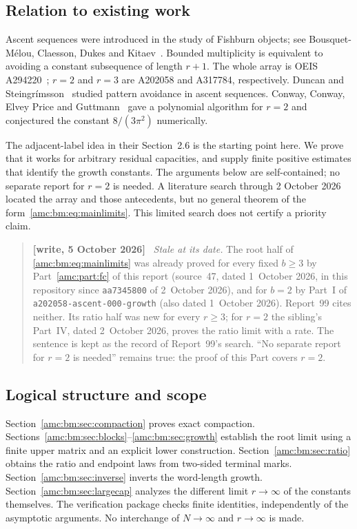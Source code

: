\documentclass[11pt,letterpaper]{article}
\theoremstyle{remark}\newtheorem{remark}[theorem]{Remark}
\newenvironment{writenotedated}[1]{\par\smallskip\begin{quote}\small\textbf{[write, #1]}\ }{\end{quote}\smallskip}
\newcommand{\repopath}[1]{\nolinkurl{#1}}
\begin{document}
\subsection{Relation to existing work}
Ascent sequences were introduced in the study of Fishburn objects; see Bousquet-M\'elou, Claesson, Dukes and Kitaev~\cite{BMCDK}. Bounded multiplicity is equivalent to avoiding a constant subsequence of length $r+1$. The whole array is OEIS A294220~\cite{array}; $r=2$ and $r=3$ are A202058 and A317784, respectively. Duncan and Steingr\'imsson~\cite{DS} studied pattern avoidance in ascent sequences. Conway, Conway, Elvey Price and Guttmann~\cite{CCEG} gave a polynomial algorithm for $r=2$ and conjectured the constant $8/(3\pi^2)$ numerically.

The adjacent-label idea in their Section~2.6 is the starting point here. We prove that it works for arbitrary residual capacities, and supply finite positive estimates that identify the growth constants. The arguments below are self-contained; no separate report for $r=2$ is needed. A literature search through 2 October 2026 located the array and those antecedents, but no general theorem of the form~\eqref{amc:bm:eq:mainlimits}. This limited search does not certify a priority claim.

\begin{writenotedated}{5 October 2026}
\emph{Stale at its date.} The root half of \eqref{amc:bm:eq:mainlimits} was already proved for every fixed $b\ge3$ by Part~\ref{amc:part:fc} of this report (source~47, dated 1~October 2026, in this repository since \texttt{aa7345800} of 2~October 2026), and for $b=2$ by Part~I of \repopath{a202058-ascent-000-growth} (also dated 1~October 2026). Report~99 cites neither. Its ratio half was new for every $r\ge3$; for $r=2$ the sibling's Part~IV, dated 2~October 2026, proves the ratio limit with a rate. The sentence is kept as the record of Report~99's search. ``No separate report for $r=2$ is needed'' remains true: the proof of this Part covers $r=2$.
\end{writenotedated}

\subsection{Logical structure and scope}
Section~\ref{amc:bm:sec:compaction} proves exact compaction. Sections~\ref{amc:bm:sec:blocks}--\ref{amc:bm:sec:growth} establish the root limit using a finite upper matrix and an explicit lower construction. Section~\ref{amc:bm:sec:ratio} obtains the ratio and endpoint laws from two-sided terminal marks. Section~\ref{amc:bm:sec:inverse} inverts the word-length growth. Section~\ref{amc:bm:sec:largecap} analyzes the different limit $r\to\infty$ of the constants themselves. The verification package checks finite identities, independently of the asymptotic arguments. No interchange of $N\to\infty$ and $r\to\infty$ is made.
\end{document}
